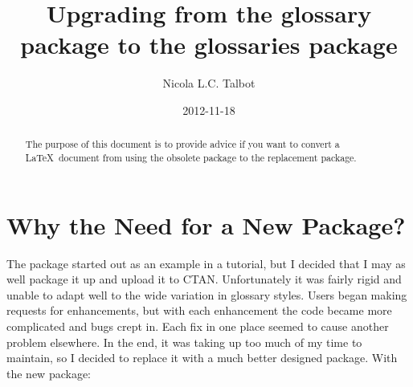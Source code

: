 \documentclass{nlctdoc}
\title{Upgrading from the glossary package to the glossaries
package}
\author{Nicola L.C. Talbot}
\date{2012-11-18}
\begin{document}
\maketitle

\begin{abstract}
The purpose of this document is to provide advice if you want to
convert a \LaTeX\ document from using the obsolete 
package to the replacement  package.
\end{abstract}

\tableofcontents

\section{Why the Need for a New Package?}
\label{whyglossaries}

The  package started out as an example in a tutorial,
but I decided that I may as well package it up and upload it to CTAN.
Unfortunately it was fairly rigid and unable to adapt well to the
wide variation in glossary styles. Users began making requests for
enhancements, but with each enhancement the code became more
complicated and bugs crept in. Each fix in one place seemed to cause
another problem elsewhere. In the end, it was taking up too much
of my time to maintain, so I decided to replace it with a much
better designed package. With the new  package:
\end{document}
